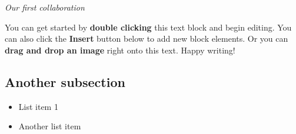 \textit{Our first collaboration} 

You can get started by \textbf{double clicking} this text block and begin editing. You can also click the \textbf{Insert} button below to add new block elements. Or you can \textbf{drag and drop an image} right onto this text. Happy writing!


\subsection{Another subsection}
\begin{itemize}
\item List item 1
\item Another list item
\end{itemize}
